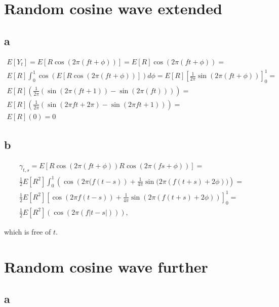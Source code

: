 \documentclass[]{book}
\begin{document}
\section{Random cosine wave extended}\label{random-cosine-wave-extended}

\subsection*{a}\label{a-19}

\begin{gather*}
  E[Y_t] = E[R \cos{(2\pi(ft+\phi))}] = E[R] \cos{(2\pi(ft+\phi))} = \\
  E[R] \int_0^1\cos(E[R \cos(2\pi(ft+\phi))])d\phi = E[R]\left[ \frac{1}{2\pi}\sin(2\pi(ft+\phi))\right]^1_0 = \\
  E[R] \left( \frac{1}{2\pi}(\sin(2\pi(ft+1)) - \sin(2\pi(ft))) \right) = \\
  E[R] \left( \frac{1}{2\pi}(\sin(2\pi ft + 2\pi) - \sin(2\pi ft + 1)) \right) = \\
  E[R] \left( 0 \right) = 0
\end{gather*}

\subsection*{b}\label{b-19}

\begin{gather*}
  \gamma_{t,s} = E[R \cos{(2\pi(ft+\phi))} R \cos{(2\pi(fs+\phi))}] = \\
  \frac{1}{2} E[R^2] \int_0^1\left(\cos{\left(2\pi(f(t-s)\right)} + \frac{1}{4\pi}\sin{(2\pi(f(t+s) + 2\phi)}) \right) =\\
  \frac{1}{2} E[R^2]\left[ \cos{(2\pi f(t-s))} + \frac{1}{4\pi}\sin{(2\pi(f(t+s) + 2\phi))} \right]^1_0 = \\
  \frac{1}{2} E[R^2]\left( \cos{(2\pi (f|t-s|))} \right),
\end{gather*}

which is free of \(t\).

\section{Random cosine wave further}\label{random-cosine-wave-further}

\subsection*{a}\label{a-20}
\end{document}
